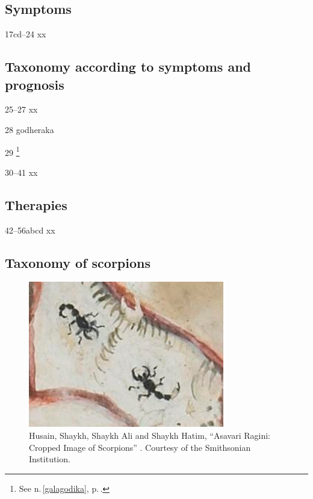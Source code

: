 \begin{translation}
\subsection{Symptoms}

\item[17cd--24] xx

\subsection{Taxonomy according to symptoms and prognosis}

\item[25--27] xx

\item [28]  \gls{godheraka}    \label{godheraka}
    
\item [29] \footnote{See n.\,\ref{galagodika}, 
p.\,\pageref{galagodika}.}


\item[30--41] xx

\subsection{Therapies}

\item[42--56abcd] xx
 
\subsection{Taxonomy of scorpions}
 
 \begin{figure}
     \centering
     \includegraphics[width=0.7\linewidth]{"media/Scorpions Smithsonian"}
     \caption{Husain, Shaykh, Shaykh Ali and Shaykh Hatim, “Asavari Ragini: 
     Cropped Image of Scorpions” \citep{husa-1591}. Courtesy of the Smithsonian 
     Institution.}
     \label{fig:scorpions-smithsonian}
 \end{figure}
 

\end{translation}
